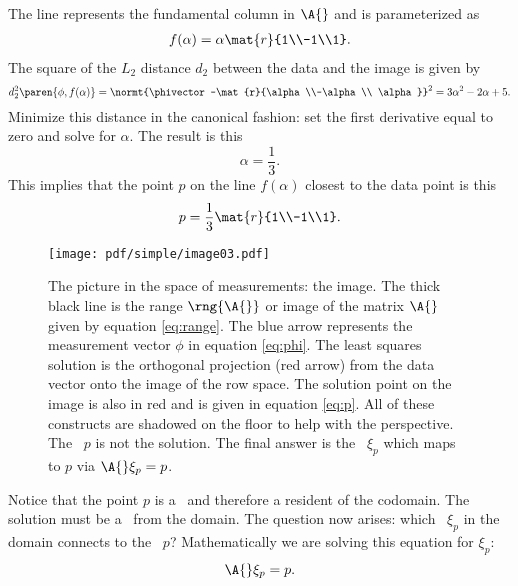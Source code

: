 The line represents the fundamental column in $\A{}$ and is parameterized as
\begin{equation}
  \begin{split}
    f(\alpha)=\alpha\mat{r}{1\\-1\\1}.
    \label{eq:range}
  \end{split}
\end{equation}
The square of the $L_{2}$ distance $d_{2}$ between the data and the image is given by
\begin{equation}
  d_{2}^{2}\paren{\phi,f(\alpha)} = \normt{\phivector-\mat{r}{\alpha\\-\alpha\\ \alpha}}^{2} = 3\alpha^{2}-2\alpha+5.
\end{equation}
Minimize this distance in the canonical fashion: set the first derivative equal to zero and solve for $\alpha$. The result is this
\begin{equation}
  \alpha = \frac{1}{3}.
\end{equation}
This implies that the point $p$ on the line $f(\alpha)$ closest to the data point is this
\begin{equation}
  p=\frac{1}{3}\mat{r}{1\\-1\\1}.
  \label{eq:p}
\end{equation}
\begin{figure}[h]
   \centering
   \texttt{[image: pdf/simple/image03.pdf]} 
   \caption[The picture in the space of measurements]{The picture in the space of measurements: the image. The thick black line is the range $\rng{\A{}}$ or image of the matrix $\A{}$ given by equation \eqref{eq:range}. The blue arrow represents the measurement vector $\phi$ in equation \eqref{eq:phi}. The least squares solution is the orthogonal projection (red arrow) from the data vector onto the image of the row space. The solution point on the image is also in red and is given in equation \eqref{eq:p}. All of these constructs are shadowed on the floor to help with the perspective. The \vvv \ $p$ is not the solution. The final answer is the \vv \ $\xi_{p}$ which maps to $p$ via $\A{}\xi_{p}=p$. }
   \label{fig:image}
\end{figure}

Notice that the point $p$ is a \vvv \ and therefore a resident of the codomain. The solution must be a \vv \ from the domain. The question now arises: which \vv \ $\xi_{p}$ in the domain connects to the \vvv \ $p$? Mathematically we are solving this equation for $\xi_{p}$:
\begin{equation}
  \A{}\xi_{p}=p.
\end{equation}

